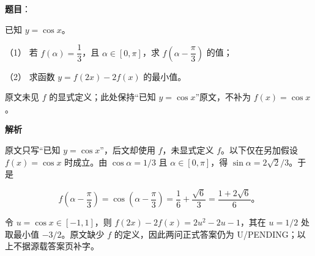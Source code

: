 \begin{answer}

\textbf{题目}：

已知 $y=\cos x$。

（1） 若 $f(\alpha)=\dfrac13$，且 $\alpha\in[0,\pi]$，求 $f\left(\alpha-\dfrac\pi3\right)$ 的值；

（2） 求函数 $y=f(2x)-2f(x)$ 的最小值。

\begin{gktip}
原文未见 $f$ 的显式定义；此处保持“已知 $y=\cos x$”原文，不补为 $f(x)=\cos x$。
\end{gktip}

\textbf{解析}

原文只写“已知 $y=\cos x$”，后文却使用 $f$，未显式定义 $f$。以下仅在另加假设 $f(x)=\cos x$ 时成立。由 $\cos\alpha=1/3$ 且 $\alpha\in[0,\pi]$，得 $\sin\alpha=2\sqrt2/3$。于是


\nopagebreak[4]
\[
f\left(\alpha-\frac\pi3\right)
=\cos\left(\alpha-\frac\pi3\right)
=\frac16+\frac{\sqrt6}{3}
=\frac{1+2\sqrt6}{6}\mbox{。}
\]


令 $u=\cos x\in[-1,1]$，则 $f(2x)-2f(x)=2u^2-2u-1$，其在 $u=1/2$ 处取最小值 $-3/2$。原文缺少 $f$ 的定义，因此两问正式答案仍为 U/PENDING；以上不据源载答案页补字。



\end{answer}
